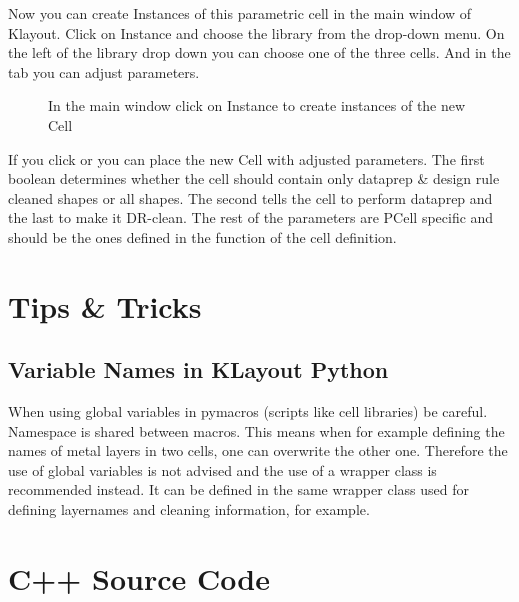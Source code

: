 \documentclass[a4paper,10pt,english]{sphinxmanual}
\begin{document}
Now you can create Instances of this parametric cell in the main window of Klayout. Click on Instance and
choose the  library from the drop-down menu. On the left of the library
drop down you can choose one of the three cells. And in the tab you can adjust parameters.

\begin{figure}[htbp]
\centering
\capstart

\noindent{}
\caption{In the main window click on Instance to create instances of the new Cell}\label{\detokenize{photonics/example_library:id4}}\end{figure}

If you click  or  you can place the new Cell with adjusted parameters. The first boolean determines
whether the cell should contain only dataprep \& design rule cleaned shapes or all shapes. The second tells the
cell to perform dataprep and the last to make it DR-clean. The rest of the parameters are PCell specific and should
be the ones defined in the  function of the cell definition.


\chapter{Tips \& Tricks}
\label{\detokenize{tips:tips-tricks}}\label{\detokenize{tips::doc}}

\section{Variable Names in KLayout Python}
\label{\detokenize{tips:variable-names-in-klayout-python}}
When using global variables in pymacros (scripts like cell libraries) be careful. Namespace is shared between macros. This means when for example defining the names of metal layers in two cells, one can overwrite the other one.
Therefore the use of global variables is not advised and the use of a wrapper class is recommended instead. It can be defined in the same wrapper class used for defining layernames and cleaning information, for example.


\chapter{C++ Source Code}
\label{\detokenize{sourcecodes:c-source-code}}\label{\detokenize{sourcecodes::doc}}
\end{document}
